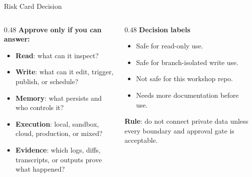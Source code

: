 \begin{frame}{Risk Card Decision}
  \begin{columns}[T,onlytextwidth]
    \begin{column}{0.48\textwidth}
      \textbf{Approve only if you can answer:}
      \begin{itemize}
        \item \textbf{Read}: \textnormal{what can it inspect?}
        \item \textbf{Write}: \textnormal{what can it edit, trigger, publish, or schedule?}
        \item \textbf{Memory}: \textnormal{what persists and who controls it?}
        \item \textbf{Execution}: \textnormal{local, sandbox, cloud, production, or mixed?}
        \item \textbf{Evidence}: \textnormal{which logs, diffs, transcripts, or outputs prove what happened?}
      \end{itemize}
    \end{column}
    \begin{column}{0.48\textwidth}
      \textbf{Decision labels}
      \begin{itemize}
        \item \textnormal{Safe for read-only use.}
        \item \textnormal{Safe for branch-isolated write use.}
        \item \textnormal{Not safe for this workshop repo.}
        \item \textnormal{Needs more documentation before use.}
      \end{itemize}
      \vspace{0.3em}
      \textbf{Rule}: \textnormal{do not connect private data unless every boundary and approval gate is acceptable.}
    \end{column}
  \end{columns}
\end{frame}

